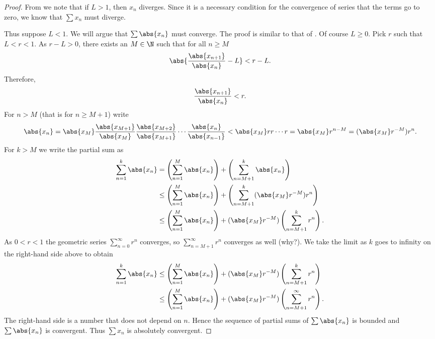 \documentclass[12pt]{book}
\begin{document}
\begin{proof}
From  we note that if $L > 1$, then $x_n$
diverges.
Since it is a necessary condition for the convergence of series
that the terms go to zero, we know that $\sum x_n$ must diverge.

Thus suppose $L < 1$.
We will argue that $\sum \abs{x_n}$ must converge.
The proof is similar to that of .
Of course $L \geq
0$.  
Pick
$r$ such that $L < r < 1$.
As $r-L > 0$, there exists an $M \in \N$ such that for
all $n \geq M$
\begin{equation*}
\abs{\frac{\abs{x_{n+1}}}{\abs{x_n}} - L} < r-L .
\end{equation*}
Therefore,
\begin{equation*}
\frac{\abs{x_{n+1}}}{\abs{x_n}} < r .
\end{equation*}
For $n > M$ (that is for $n \geq M+1$)
write
\begin{equation*}
\abs{x_n} =
\abs{x_M}
\frac{\abs{x_{M+1}}}{\abs{x_{M}}}
\frac{\abs{x_{M+2}}}{\abs{x_{M+1}}}
\cdots
\frac{\abs{x_{n}}}{\abs{x_{n-1}}}
<
\abs{x_M}
r r \cdots r = \abs{x_M} r^{n-M} = (\abs{x_M} r^{-M}) r^n .
\end{equation*}
For $k > M$ we write the partial sum as
\begin{equation*}
\begin{split}
\sum_{n=1}^k \abs{x_n}
& =
\left(\sum_{n=1}^{M} \abs{x_n} \right)
+
\left(\sum_{n=M+1}^{k} \abs{x_n} \right)
\\
& \leq
\left(\sum_{n=1}^{M} \abs{x_n} \right)
+
\left(\sum_{n=M+1}^{k} 
(\abs{x_M} r^{-M}) r^n
\right)
\\
& \leq
\left(\sum_{n=1}^{M} \abs{x_n} \right)
+
(\abs{x_M} r^{-M})
\left( \sum_{n=M+1}^{k} r^n \right) .
\end{split}
\end{equation*}
As $0 < r < 1$ the geometric series
$\sum_{n=0}^{\infty} r^n$ converges, so
$\sum_{n=M+1}^{\infty} r^n$ converges as well (why?).
We take the
limit as $k$ goes to infinity on the right-hand side above to obtain
\begin{equation*}
\begin{split}
\sum_{n=1}^k \abs{x_n}
& \leq
\left(\sum_{n=1}^{M} \abs{x_n} \right)
+
(\abs{x_M} r^{-M})
\left( \sum_{n=M+1}^{k} r^n \right) 
\\
& \leq
\left(\sum_{n=1}^{M} \abs{x_n} \right)
+
(\abs{x_M} r^{-M})
\left( \sum_{n=M+1}^{\infty} r^n \right) .
\end{split}
\end{equation*}
The right-hand side is a number that does not depend on $n$.
Hence the sequence of partial sums of $\sum \abs{x_n}$ is bounded
and $\sum \abs{x_n}$ is convergent.
Thus $\sum x_n$ is
absolutely convergent.
\end{proof}
\end{document}
